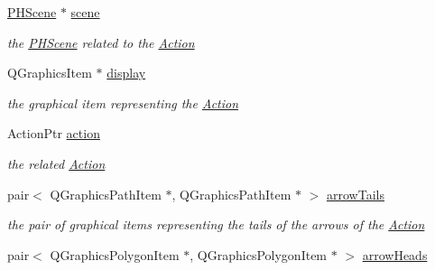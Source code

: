 \begin{DoxyCompactItemize}
\item 
\hypertarget{class_g_action_a5318deb6935859f5d2ebd1836ec6eb85}{\hyperlink{class_p_h_scene}{\-P\-H\-Scene} $\ast$ \hyperlink{class_g_action_a5318deb6935859f5d2ebd1836ec6eb85}{scene}}\label{class_g_action_a5318deb6935859f5d2ebd1836ec6eb85}

\begin{DoxyCompactList}\small\item\em the \hyperlink{class_p_h_scene}{\-P\-H\-Scene} related to the \hyperlink{class_action}{\-Action} \end{DoxyCompactList}\item 
\hypertarget{class_g_action_a80fd22faf283374dd9861bf4900eafa4}{\-Q\-Graphics\-Item $\ast$ \hyperlink{class_g_action_a80fd22faf283374dd9861bf4900eafa4}{display}}\label{class_g_action_a80fd22faf283374dd9861bf4900eafa4}

\begin{DoxyCompactList}\small\item\em the graphical item representing the \hyperlink{class_action}{\-Action} \end{DoxyCompactList}\item 
\hypertarget{class_g_action_a22f734f6fb2fade298681819341b4f75}{\-Action\-Ptr \hyperlink{class_g_action_a22f734f6fb2fade298681819341b4f75}{action}}\label{class_g_action_a22f734f6fb2fade298681819341b4f75}

\begin{DoxyCompactList}\small\item\em the related \hyperlink{class_action}{\-Action} \end{DoxyCompactList}\item 
\hypertarget{class_g_action_abc626fc7dc52a5f02960706c02a52db9}{pair$<$ \-Q\-Graphics\-Path\-Item \*
$\ast$, \-Q\-Graphics\-Path\-Item $\ast$ $>$ \hyperlink{class_g_action_abc626fc7dc52a5f02960706c02a52db9}{arrow\-Tails}}\label{class_g_action_abc626fc7dc52a5f02960706c02a52db9}

\begin{DoxyCompactList}\small\item\em the pair of graphical items representing the tails of the arrows of the \hyperlink{class_action}{\-Action} \end{DoxyCompactList}\item 
\hypertarget{class_g_action_aab9cc72a8692e0b15f19e192ab21d609}{pair$<$ \-Q\-Graphics\-Polygon\-Item \*
$\ast$, \-Q\-Graphics\-Polygon\-Item $\ast$ $>$ \hyperlink{class_g_action_aab9cc72a8692e0b15f19e192ab21d609}{arrow\-Heads}}\label{class_g_action_aab9cc72a8692e0b15f19e192ab21d609}


\end{DoxyCompactItemize}
